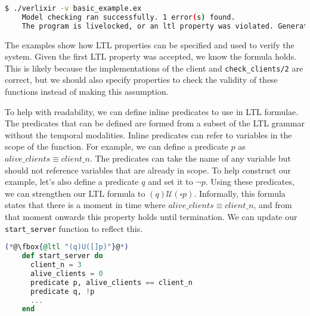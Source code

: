 \begin{lstlisting}[language=bash, xleftmargin=.1\linewidth]
    $ ./verlixir -v basic_example.ex
    Model checking ran successfully. 1 error(s) found.
    The program is livelocked, or an ltl property was violated. Generating trace.
\end{lstlisting}
The examples show how LTL properties can be specified and used to verify the system. Given the first LTL property was accepted, we know the formula holds. This is likely because the implementations of the client and \texttt{check\_clients/2} are correct, but we should also specify properties to check the validity of these functions instead of making this assumption.
\par
To help with readability, we can define inline predicates to use in LTL formulae. The predicates that can be defined are formed from a subset of the LTL grammar without the temporal modalities. Inline predicates can refer to variables in the scope of the function. For example, we can define a predicate \( p \) as $alive\_clients \equiv client\_n$. The predicates can take the name of any variable but should not reference variables that are already in scope. To help construct our example, let's also define a predicate \( q \) and set it to \( \neg p \). Using these predicates, we can strengthen our LTL formula to \( (q) \mathcal{U} (\square p) \). Informally, this formula states that there is a moment in time where $alive\_clients \equiv client\_n$, and from that moment onwards this property holds until termination. We can update our \texttt{start\_server} function to reflect this.
\begin{lstlisting}[language=Elixir, xleftmargin=.3\linewidth]
    (*@\fbox{@ltl "(q)U([]p)"}@*)
    def start_server do
      client_n = 3
      alive_clients = 0
      predicate p, alive_clients == client_n
      predicate q, !p
      ...
    end
\end{lstlisting}
